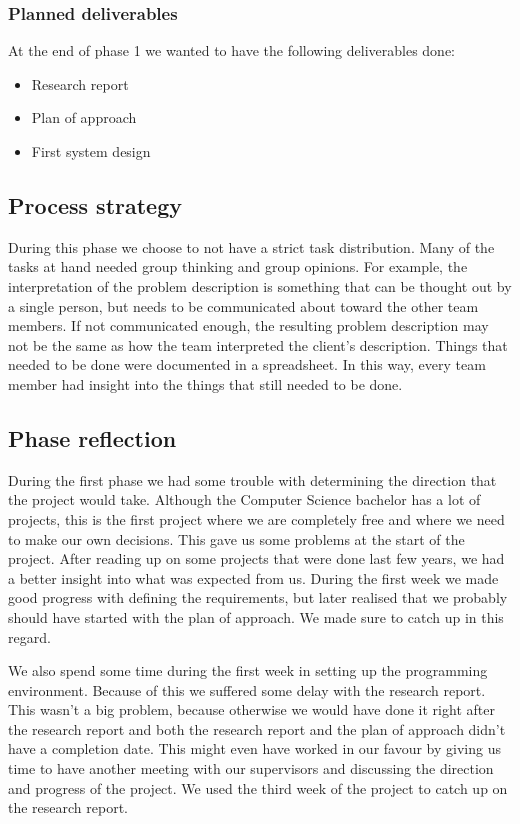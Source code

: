 \subsubsection{Planned deliverables}
At the end of phase 1 we wanted to have the following deliverables done:
\begin{itemize}
\item Research report
\item Plan of approach
\item First system design
\end{itemize}

\subsection{Process strategy}
During this phase we choose to not have a strict task distribution.
Many of the tasks at hand needed group thinking and group opinions.
For example, the interpretation of the problem description is something that can be thought out by a single person, but needs to be communicated about toward the other team members.
If not communicated enough, the resulting problem description may not be the same as how the team interpreted the client's description.
Things that needed to be done were documented in a spreadsheet.
In this way, every team member had insight into the things that still needed to be done.

\subsection{Phase reflection}
During the first phase we had some trouble with determining the direction that the project would take.
Although the Computer Science bachelor has a lot of projects, this is the first project where we are completely free and where we need to make our own decisions. 
This gave us some problems at the start of the project.
After reading up on some projects that were done last few years, we had a better insight into what was expected from us.
During the first week we made good progress with defining the requirements, but later realised that we probably should have started with the plan of approach.
We made sure to catch up in this regard.

We also spend some time during the first week in setting up the programming environment.
Because of this we suffered some delay with the research report.
This wasn't a big problem, because otherwise we would have done it right after the research report and both the research report and the plan of approach didn't have a completion date.
This might even have worked in our favour by giving us time to have another meeting with our supervisors and discussing the direction and progress of the project.
We used the third week of the project to catch up on the research report.


